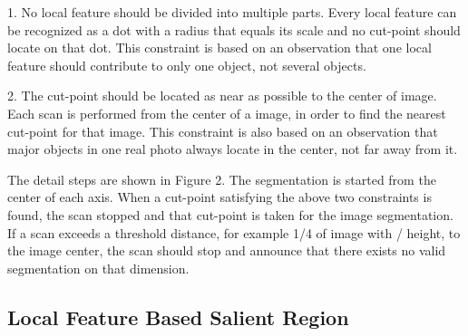 1. No local feature should be divided into multiple parts. Every local feature can be recognized as a dot with a radius that equals its scale and no cut-point should locate on that dot. This constraint is based on an observation that one local feature should contribute to only one object, not several objects.

2. The cut-point should be located as near as possible to the center of image. Each scan is performed from the center of a image, in order to find the nearest cut-point for that image. This constraint is also based on an observation that major objects in one real photo always locate in the center, not far away from it.

The detail steps are shown in Figure 2. The segmentation is started from the center of each axis. When a cut-point satisfying the above two constraints is found, the scan stopped and that cut-point is taken for the image segmentation. If a scan exceeds a threshold distance, for example 1/4 of image with / height, to the image center, the scan should stop and announce that there exists no valid segmentation on that dimension. 

\subsection{Local Feature Based Salient Region}